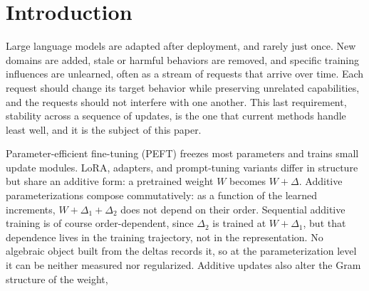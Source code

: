 \documentclass[
]{article}
\begin{document}
\begin{abstract}
Matrix-level and small-network experiments confirm the geometry, with Gram deviation at numerical precision against roughly \(10^{-2}\) for additive updates, and the composition bound, with second-order BCH accumulation \(27\) to \(2200\) times more accurate than naive generator addition across the norms tested. The central hypothesis, that commutator magnitude predicts sequential interference in transformer unlearning, is stated so that it can be refuted; a first test on Llama-3.2-1B supports it, with the normalized commutator predicting cumulative interference across sequential unlearning windows (Spearman \(\rho=0.25\), \(p=2.6\times10^{-3}\), holding within conditions and after controlling for update magnitude, condition, and pair gap), and the full benchmark test through a standard unlearning harness is the empirical question that remains. We do not claim to eliminate catastrophic forgetting or to guarantee semantic preservation: geometry preservation is a parameter-space property, not a functional one.

\emph{Code, configurations, seeds, and raw results are archived at https://doi.org/10.5281/zenodo.21267659 and mirrored at https://github.com/design-smith/lie-algebraic-unlearning-release}

\end{abstract}

\section{Introduction}\label{introduction}

Large language models are adapted after deployment, and rarely just once. New domains are added, stale or harmful behaviors are removed, and specific training influences are unlearned, often as a stream of requests that arrive over time. Each request should change its target behavior while preserving unrelated capabilities, and the requests should not interfere with one another. This last requirement, stability across a sequence of updates, is the one that current methods handle least well, and it is the subject of this paper.

Parameter-efficient fine-tuning (PEFT) freezes most parameters and trains small update modules. LoRA, adapters, and prompt-tuning variants differ in structure but share an additive form: a pretrained weight \(W\) becomes \(W+\Delta\). Additive parameterizations compose commutatively: as a function of the learned increments, \(W+\Delta_1+\Delta_2\) does not depend on their order. Sequential additive training is of course order-dependent, since \(\Delta_2\) is trained at \(W+\Delta_1\), but that dependence lives in the training trajectory, not in the representation. No algebraic object built from the deltas records it, so at the parameterization level it can be neither measured nor regularized. Additive updates also alter the Gram structure of the weight,
\end{document}
